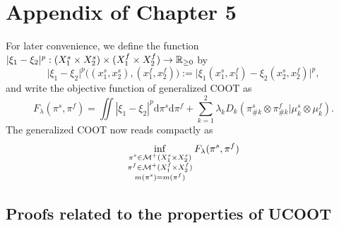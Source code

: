 \section{Appendix of Chapter 5}

For later convenience, we define the function
$\vert \xi_1 - \xi_2 \vert^p: (X_1^s \times X_2^s) \times (X_1^f \times X_2^f) \to \mathbb R_{\geq 0}$ by
\begin{equation}
    \vert \xi_1 - \xi_2 \vert^p \big((x_1^s, x_2^s), (x_1^f, x_2^f)\big) :=
    \vert \xi_1(x_1^s, x_1^f) - \xi_2(x_2^s, x_2^f) \vert^p,
\end{equation}
and write the objective function of generalized COOT as
\begin{equation}
    F_{\lambda}(\pi^s, \pi^f) = \iint |\xi_1 - \xi_2|^p \mathrm d\pi^s \mathrm d \pi^f
    + \sum_{k=1}^2\lambda_k D_k(\pi^s_{\#k} \otimes \pi^f_{\#k} \vert \mu^s_k \otimes \mu^f_k).
\end{equation}
The generalized COOT now reads compactly as
\begin{equation} \label{eq:ucoot_copy}
  \inf_{\substack{\pi^s \in \mathcal M^+(X_1^s \times X_2^s) \\
  \pi^f \in \mathcal M^+(X_1^f \times X_2^f) \\ m(\pi^s) = m(\pi^f)}} F_{\lambda}(\pi^s, \pi^f)
\end{equation}

\subsection{Proofs related to the properties of UCOOT}

